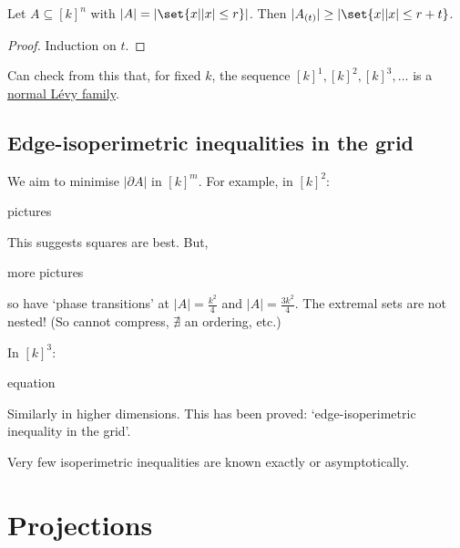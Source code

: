 \documentclass{article}
\let\subset\subseteq
\begin{document}
\begin{ncor}\label{cor:2.11}
  Let $A \subset [k]^n$ with $|A| = |\set{x | |x| \leq r}|$. Then $|A_{(t)}| \geq |\set{x | |x| \leq r + t}$.
\end{ncor}
\begin{proof}
  Induction on $t$.
\end{proof}
\begin{remark}
  Can check from this that, for fixed $k$, the sequence $[k]^1, [k]^2, [k]^3, \dotsc$ is a \hyperlink{def:levyfam}{normal L\'evy family}.
\end{remark}
\subsection{Edge-isoperimetric inequalities in the grid}
We aim to minimise $|\partial A|$ in $[k]^m$.
For example, in $[k]^2$:
\begin{center}
  pictures
\end{center}
This suggests squares are best.
But,
\begin{center}
  more pictures
\end{center}
so have `phase transitions' at $|A| = \frac{k^2}{4}$ and $|A| = \frac{3k^2}{4}$.
The extremal sets are not nested! (So cannot compress, $\nexists$ an ordering, etc.)

In $[k]^3$:
\begin{center}
  equation
\end{center}

Similarly in higher dimensions.
This has been proved: `edge-isoperimetric inequality in the grid'.

Very few isoperimetric inequalities are known exactly or asymptotically.
\clearpage
\section{Projections}
\printindex
\end{document}
